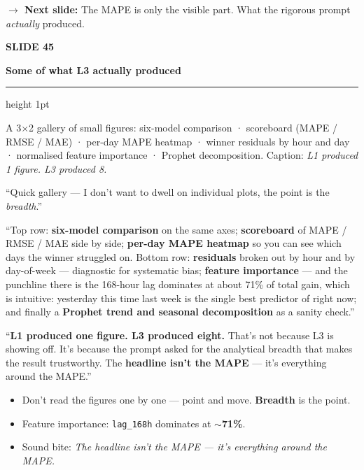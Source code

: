 \documentclass[11pt,a4paper]{article}
\newcommand{\slidehead}[2]{%
  \vspace{2pt}%
  {\small\color{mutedgrey}\textbf{SLIDE #1}}\par
  {\LARGE\color{jrcblue}\bfseries #2}\par
  \vspace{6pt}%
  {\color{jrcblue}\hrule height 1pt}%
  \vspace{8pt}%
}
\newcommand{\block}[1]{\par\vspace{4pt}{\small\color{jrcblue}\textbf{\MakeUppercase{#1}}}\par\vspace{2pt}}
\newenvironment{anchors}{%
  \begin{tcolorbox}[colback=jrcblue!6, colframe=jrcblue!50, boxrule=0.6pt, arc=2pt,
                    left=10pt, right=10pt, top=6pt, bottom=6pt, fontupper=\small,
                    title={\bfseries Anchor facts}, coltitle=jrcblue,
                    fonttitle=\small\bfseries, attach title to upper,
                    after title={\par\vspace{2pt}}]
}{%
  \end{tcolorbox}
}
\newenvironment{sayblock}{%
  \begin{tcolorbox}[colback=cardbg, colframe=jrcblue, boxrule=0.8pt, arc=2pt,
                    left=10pt, right=10pt, top=6pt, bottom=6pt, fontupper=\normalsize,
                    title={\bfseries Say this}, coltitle=white, colbacktitle=jrcblue,
                    fonttitle=\small\bfseries]
}{%
  \end{tcolorbox}
}
\newcommand{\transition}[1]{%
  \par\vspace{4pt}%
  \begin{tcolorbox}[colback=white, colframe=mutedgrey!40, boxrule=0.5pt, arc=2pt,
                    left=10pt, right=10pt, top=4pt, bottom=4pt, fontupper=\small]
    {\color{mutedgrey}\textbf{\textsf{$\to$ Next slide:}}} #1
  \end{tcolorbox}
}
\begin{document}
\transition{The MAPE is only the visible part. What the rigorous prompt
\emph{actually} produced.}

\newpage

\slidehead{45}{Some of what L3 actually produced}

\block{On screen}
A 3$\times$2 gallery of small figures: six-model comparison · scoreboard
(MAPE / RMSE / MAE) · per-day MAPE heatmap · winner residuals by hour and day
· normalised feature importance · Prophet decomposition. Caption: \emph{L1
produced 1 figure. L3 produced 8.}

\begin{sayblock}
``Quick gallery — I don't want to dwell on individual plots, the point is the
\emph{breadth}.''\par\vspace{6pt}

``Top row: \textbf{six-model comparison} on the same axes; \textbf{scoreboard}
of MAPE / RMSE / MAE side by side; \textbf{per-day MAPE heatmap} so you can see
which days the winner struggled on. Bottom row: \textbf{residuals} broken out
by hour and by day-of-week — diagnostic for systematic bias; \textbf{feature
importance} — and the punchline there is the 168-hour lag dominates at about
71\% of total gain, which is intuitive: yesterday this time last week is the
single best predictor of right now; and finally a \textbf{Prophet trend and
seasonal decomposition} as a sanity check.''\par\vspace{4pt}

``\textbf{L1 produced one figure. L3 produced eight.} That's not because L3 is
showing off. It's because the prompt asked for the analytical breadth that
makes the result trustworthy. The \textbf{headline isn't the MAPE} — it's
everything around the MAPE.''
\end{sayblock}

\begin{anchors}
\begin{itemize}
\item Don't read the figures one by one — point and move. \textbf{Breadth} is the point.
\item Feature importance: \texttt{lag\_168h} dominates at $\sim$\textbf{71\%}.
\item Sound bite: \emph{The headline isn't the MAPE — it's everything around the MAPE.}
\end{itemize}
\end{anchors}
\end{document}
